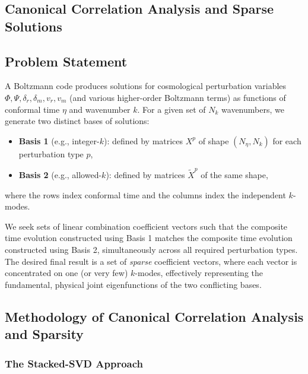 \begin{subappendices}

\section{Canonical Correlation Analysis and Sparse Solutions}\label{sec:CCA_sparse}

\subsection{Problem Statement}

A Boltzmann code produces solutions for cosmological perturbation variables \(\Phi,\Psi,\delta_r, \delta_m, v_r, v_m\) (and various higher-order Boltzmann terms) as functions of conformal time $\eta$ and wavenumber $k$. For a given set of $N_k$ wavenumbers, we generate two distinct bases of solutions:

\begin{itemize}
    \item \textbf{Basis 1} (e.g., integer-$k$): defined by matrices $X^p$ of shape $(N_\eta, N_k)$ for each perturbation type $p$,
    \item \textbf{Basis 2} (e.g., allowed-$k$): defined by matrices $\tilde X^p$ of the same shape,
\end{itemize}
where the rows index conformal time and the columns index the independent $k$-modes.

We seek sets of linear combination coefficient vectors such that the composite time evolution constructed using Basis 1 matches the composite time evolution constructed using Basis 2, simultaneously across all required perturbation types. The desired final result is a set of \textit{sparse} coefficient vectors, where each vector is concentrated on one (or very few) $k$-modes, effectively representing the fundamental, physical joint eigenfunctions of the two conflicting bases.


\subsection{Methodology of Canonical Correlation Analysis and Sparsity}
\subsubsection{The Stacked-SVD Approach}


\end{subappendices}
